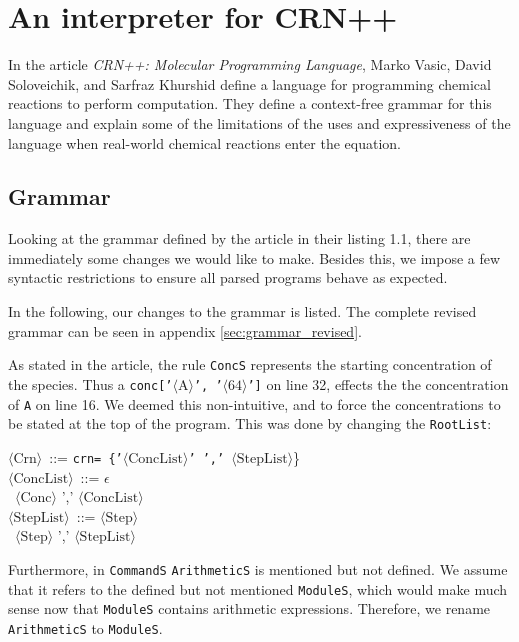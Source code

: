 \section{An interpreter for CRN++}

In the article \textit{CRN++: Molecular Programming Language}, Marko Vasic, David Soloveichik, and Sarfraz Khurshid define a language for programming chemical reactions to perform computation. They define a context-free grammar for this language and explain some of the limitations of the uses and expressiveness of the language when real-world chemical reactions enter the equation. 


\subsection{Grammar}

Looking at the grammar defined by the article in their listing 1.1, there are immediately some changes we would like to make. Besides this, we impose a few syntactic restrictions to ensure all parsed programs behave as expected. 

In the following, our changes to the grammar is listed. The complete revised grammar can be seen in appendix \ref{sec:grammar_revised}. 




As stated in the article, the rule \texttt{ConcS} represents the starting concentration of the species. Thus a \texttt{conc['$\langle \text{A} \rangle$', '$\langle \text{64} \rangle$']} on line 32, effects the the concentration of \texttt{A} on line 16. We deemed this non-intuitive, and to force the concentrations to be stated at the top of the program. This was done by changing the \texttt{RootList}:
\begin{tabbing}
    $\langle \text{Crn} \rangle$ \,::=\; \= \texttt{crn= \{'$\langle \text{ConcList} \rangle$' ',' $\langle \text{StepList} \rangle$}\} \\
    
    $\langle \text{ConcList} \rangle$ \,::=\;  $ \epsilon$ \\
    
     \>\textbar \, $\langle \text{Conc} \rangle$ ',' $\langle \text{ConcList} \rangle$ \\

      $\langle \text{StepList} \rangle$ \,::=\;  $\langle \text{Step} \rangle$ \\

      \>\textbar \, $\langle \text{Step} \rangle$ ',' $\langle \text{StepList} \rangle$ \\
\end{tabbing}
Furthermore, in \texttt{CommandS} \texttt{ArithmeticS} is mentioned but not defined. We assume that it refers to the defined but not mentioned \texttt{ModuleS}, which would make much sense now that \texttt{ModuleS} contains arithmetic expressions. Therefore, we rename \texttt{ArithmeticS} to \texttt{ModuleS}.\\

